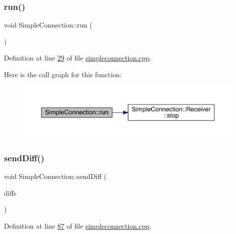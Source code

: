 \mbox{\label{a00125_a35045483589d14a436ee83346365ce70}} 
\subsubsection{\texorpdfstring{run()}{run()}}
{\footnotesize\ttfamily void Simple\+Connection\+::run (\begin{DoxyParamCaption}{ }\end{DoxyParamCaption})\hspace{0.3cm}{\ttfamily [protected]}}



Definition at line \hyperlink{a00005_source_l00029}{29} of file \hyperlink{a00005_source}{simpleconnection.\+cpp}.

Here is the call graph for this function\+:
\nopagebreak
\begin{figure}[H]
\begin{center}
\leavevmode
\includegraphics[width=350pt]{dc/dfe/a00125_a35045483589d14a436ee83346365ce70_cgraph}
\end{center}
\end{figure}
\mbox{\label{a00125_ab580ce17f2b9632414475a49dff64cce}} 
\subsubsection{\texorpdfstring{send\+Diff()}{sendDiff()}}
{\footnotesize\ttfamily void Simple\+Connection\+::send\+Diff (\begin{DoxyParamCaption}\item[{Q\+List$<$ \hyperlink{a00141}{Diff\+Element} $\ast$$>$ $\ast$}]{diffs }\end{DoxyParamCaption})}



Definition at line \hyperlink{a00005_source_l00087}{87} of file \hyperlink{a00005_source}{simpleconnection.\+cpp}.



